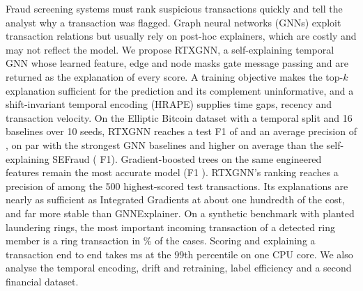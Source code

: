 Fraud screening systems must rank suspicious transactions quickly and tell the analyst why a transaction was flagged. Graph neural networks (GNNs) exploit transaction relations but usually rely on post-hoc explainers, which are costly and may not reflect the model. We propose RTXGNN, a self-explaining temporal GNN whose learned feature, edge and node masks gate message passing and are returned as the explanation of every score. A training objective makes the top-$k$ explanation sufficient for the prediction and its complement uninformative, and a shift-invariant temporal encoding (HRAPE) supplies time gaps, recency and transaction velocity. On the Elliptic Bitcoin dataset with a temporal split and 16 baselines over 10 seeds, RTXGNN reaches a test F1 of \rtxFone{} and an average precision of \rtxAP{}, on par with the strongest GNN baselines and higher on average than the self-explaining SEFraud (\deltaFOnesefraud{} F1). Gradient-boosted trees on the same engineered features remain the most accurate model (F1 \xgbFone). RTXGNN's ranking reaches a precision of \rtxPrecAtFive{} among the 500 highest-scored test transactions. Its explanations are nearly as sufficient as Integrated Gradients at about one hundredth of the cost, and far more stable than GNNExplainer. On a synthetic benchmark with planted laundering rings, the most important incoming transaction of a detected ring member is a ring transaction in \ringHitPct\% of the cases. Scoring and explaining a transaction end to end takes \rtxLatBoneP{} ms at the 99th percentile on one CPU core. We also analyse the temporal encoding, drift and retraining, label efficiency and a second financial dataset.
